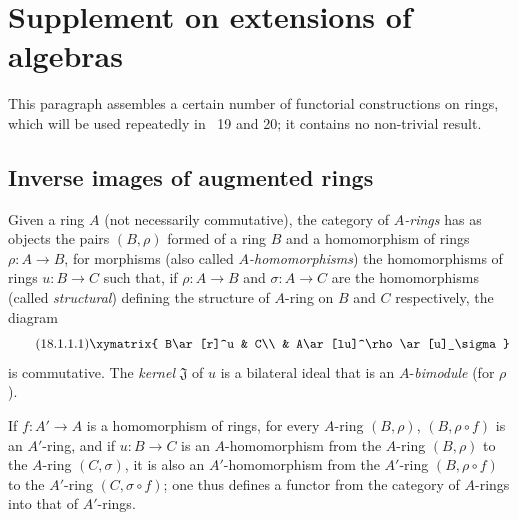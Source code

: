 \section{Supplement on extensions of algebras}
\label{section:0.18}


This paragraph assembles a certain number of functorial constructions on rings, which will be used repeatedly in \textsection\textsection~19 and 20; it contains no non-trivial result.

\subsection{Inverse images of augmented rings}
\label{subsection:0.18.1}

\begin{env}[18.1.1]
\label{0.18.1.1}
Given a ring $A$ (not necessarily commutative), the category of \emph{$A$-rings} has as objects the pairs $(B,\rho)$ formed of a ring $B$ and a homomorphism of rings $\rho:A\to B$, for morphisms (also called \emph{$A$-homomorphisms}) the homomorphisms of rings $u:B\to C$ such that, if $\rho:A\to B$ and $\sigma:A\to C$ are the homomorphisms (called \emph{structural}) defining the structure of $A$-ring on $B$ and $C$ respectively, the diagram
\begin{equation}
\tag{18.1.1.1}
  \label{0.18.1.1.1}
  \xymatrix{
    B\ar[r]^u & C\\
    & A\ar[lu]^\rho\ar[u]_\sigma
  }
\end{equation}
is commutative.
The \emph{kernel} $\mathfrak{J}$ of $u$ is a bilateral ideal that is an $A$-\emph{bimodule} (for $\rho$).

If $f:A'\to A$ is a homomorphism of rings, for every $A$-ring $(B,\rho)$, $(B,\rho\circ f)$ is an $A'$-ring, and if $u:B\to C$ is an $A$-homomorphism from the $A$-ring $(B,\rho)$ to the $A$-ring $(C,\sigma)$, it is also an $A'$-homomorphism from the $A'$-ring $(B,\rho\circ f)$ to the $A'$-ring $(C,\sigma\circ f)$; one thus defines a functor from the category of $A$-rings into that of $A'$-rings.
\end{env}

